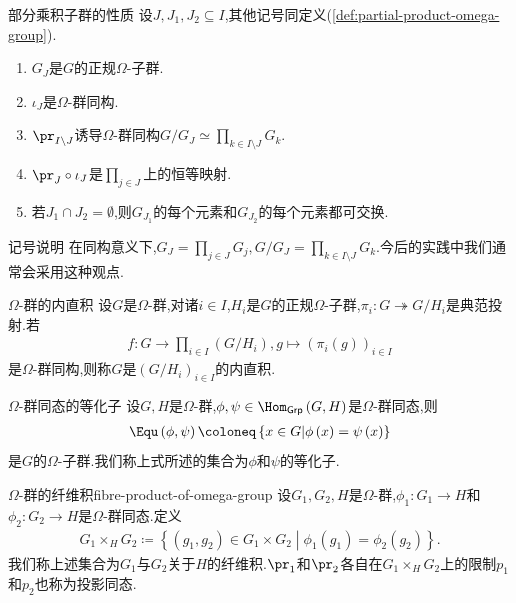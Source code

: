 \begin{proposition}{部分乘积子群的性质}{}
	设$J,J_{1},J_{2}\subseteq I$,其他记号同定义(\cref{def:partial-product-omega-group}).
	\begin{enumerate}
		\item $G_{J}$是$G$的正规$\Omega$-子群.
		\item $\iota_{J}$是$\Omega$-群同构.
		\item $\pr_{I\setminus J}$诱导$\Omega$-群同构$G/G_{J}\simeq\prod\limits_{k\in I\setminus J}G_{k}$.
		\item $\pr_{J}\circ\iota_{J}$是$\prod\limits_{j\in J}$上的恒等映射.
		\item 若$J_{1}\cap J_{2}=\emptyset$,则$G_{J_{1}}$的每个元素和$G_{J_{2}}$的每个元素都可交换.
	\end{enumerate}
\end{proposition}

\begin{remark}{记号说明}{}
	在同构意义下,$G_{J}=\prod\limits_{j\in J}G_{j},G/G_{J}=\prod\limits_{k\in I\setminus J}G_{k}$.今后的实践中我们通常会采用这种观点.
\end{remark}

\begin{definition}{$\Omega$-群的内直积}{}
	设$G$是$\Omega$-群,对诸$i\in I$,$H_{i}$是$G$的正规$\Omega$-子群,$\pi_{i}:G\twoheadrightarrow G/H_{i}$是典范投射.若
	\begin{align*}
		f:G\to\prod\limits_{i\in I}\left(G/H_{i}\right),g\mapsto\left(\pi_{i}\left(g\right)\right)_{i\in I}
	\end{align*}
	是$\Omega$-群同构,则称$G$是$\left(G/H_{i}\right)_{i\in I}$的内直积.
\end{definition}

\begin{definition}{$\Omega$-群同态的等化子}{}
	设$G,H$是$\Omega$-群,$\phi,\psi\in\Hom_{\mathsf{Grp}}\left(G,H\right)$是$\Omega$-群同态,则
	\begin{align*}
		\Equ\left(\phi,\psi\right)\coloneq\left\{x\in G\middle|\phi\left(x\right)=\psi\left(x\right)\right\}
	\end{align*}
	是$G$的$\Omega$-子群.我们称上式所述的集合为$\phi$和$\psi$的等化子.
\end{definition}

\begin{definition}{$\Omega$-群的纤维积}{fibre-product-of-omega-group}
	设$G_{1},G_{2},H$是$\Omega$-群,$\phi_{1}:G_{1}\to H$和$\phi_{2}:G_{2}\to H$是$\Omega$-群同态.定义
	\begin{align*}
		G_{1}\times_{H}G_{2}\coloneq\left\{\left(g_{1},g_{2}\right)\in G_{1}\times G_{2}\middle|\phi_{1}\left(g_{1}\right)=\phi_{2}\left(g_{2}\right)\right\}.
	\end{align*}
	我们称上述集合为$G_{1}$与$G_{2}$关于$H$的纤维积.$\pr_{1}$和$\pr_{2}$各自在$G_{1}\times_{H}G_{2}$上的限制$p_{1}$和$p_{2}$也称为投影同态.
\end{definition}

